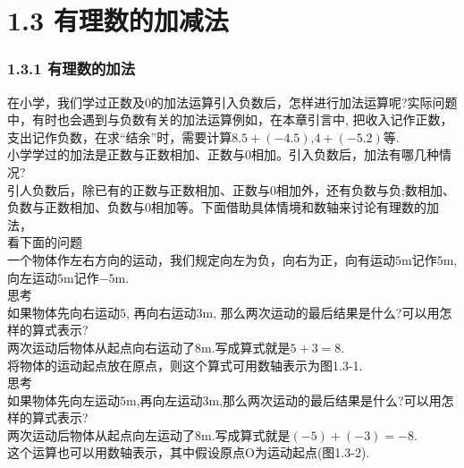 \documentclass{article}
\begin{document}
\maketitle

\section{1.3 有理数的加减法}

\subsubsection*{1.3.1 有理数的加法}

在小学，我们学过正数及$0$的加法运算引入负数后，怎样进行加法运算呢?实际问题中，有时也会遇到与负数有关的加法运算例如，在本章引言中, 把收入记作正数，支出记作负数，在求“结余”时，需要计算$8.5+(-4.5)$,$4+(-5.2)$等.\\


小学学过的加法是正数与正数相加、正数与$0$相加。引入负数后，加法有哪几种情况?\\

引人负数后，除已有的正数与正数相加、正数与$0$相加外，还有负数与负;数相加、负数与正数相加、负数与$0$相加等。下面借助具体情境和数轴来讨论有理数的加法，\\
看下面的问题\\
一个物体作左右方向的运动，我们规定向左为负，向右为正，向有运动$5$m记作$5$m,向左运动$5$m记作$-5$m.\\


思考\\

如果物体先向右运动$5$, 再向右运动$3$m, 那么两次运动的最后结果是什么?可以用怎样的算式表示?\\

两次运动后物体从起点向右运动了$8$m.写成算式就是$5+3=8$.\\

将物体的运动起点放在原点，则这个算式可用数轴表示为图1.3-1.\\



思考\\

如果物体先向左运动$5$m,再向左运动$3$m,那么两次运动的最后结果是什么?可以用怎样的算式表示? \\

两次运动后物体从起点向左运动了8m.写成算式就是$(-5)+(-3)=- 8$.\\

这个运算也可以用数轴表示，其中假设原点O为运动起点(图1.3-2).\\
\end{document}
